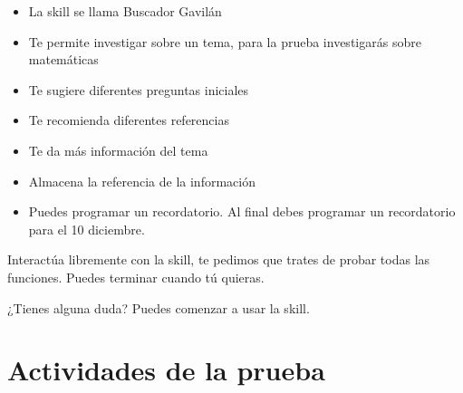 \begin{tcolorbox}[colback=white!25!white,colframe=blue]
  \begin{itemize}
    \item La skill se llama Buscador Gavilán
    \item Te permite investigar sobre un tema, para la prueba investigarás sobre matemáticas
    \item Te sugiere diferentes preguntas iniciales
    \item Te recomienda diferentes referencias
    \item Te da más información del tema
    \item Almacena la referencia de la información
    \item Puedes programar un recordatorio. Al final debes programar un recordatorio para el 10 diciembre.
  \end{itemize}

  Interactúa libremente con la skill, te pedimos que trates de probar todas las funciones. Puedes terminar cuando tú quieras.

  ¿Tienes alguna duda?
  Puedes comenzar a usar la skill.

\end{tcolorbox}


\section{Actividades de la prueba}
\label{B3Anexo}

